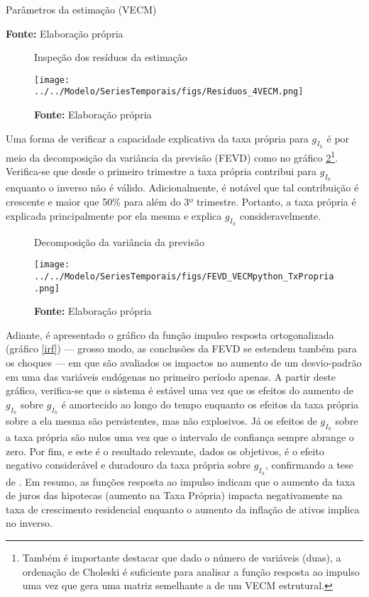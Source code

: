 \begin{table}[H]
	\centering
	\caption{Parâmetros da estimação (VECM)}
	
	\caption*{\textbf{Fonte:} Elaboração própria}
\end{table}

\begin{figure}[H]
	\centering
	\caption{Inspeção dos resíduos da estimação}
	\label{residuos}
	\texttt{[image: ../../Modelo/SeriesTemporais/figs/Residuos\_4VECM.png]}
	\caption*{\textbf{Fonte:} Elaboração própria}
\end{figure}




Uma forma de verificar a capacidade explicativa da taxa própria para $g_{I_h}$ é por meio da decomposição da variância da previsão (FEVD) como no gráfico \ref{fevd}\footnote{Também é importante destacar que dado o número de variáveis (duas), a ordenação de Choleski é suficiente para analisar a função resposta ao impulso uma vez que gera uma matriz semelhante a de um VECM estrutural. 
}. Verifica-se que desde o primeiro trimestre a taxa própria contribui para $g_{I_h}$ enquanto o inverso não é válido. Adicionalmente, é notável que tal contribuição é crescente e maior que 50\% para além do 3º trimestre. Portanto, a taxa própria é explicada principalmente por ela mesma e explica $g_{I_h}$ consideravelmente.

\begin{figure}[htb]
	\centering
	\caption{Decomposição da variância da previsão}
	\label{fevd}
	\texttt{[image: ../../Modelo/SeriesTemporais/figs/FEVD\_VECMpython\_TxPropria.png]}
	\caption*{\textbf{Fonte:} Elaboração própria}
\end{figure}


Adiante, é apresentado o gráfico da função impulso resposta ortogonalizada (gráfico \ref{irf}) --- grosso modo, as conclusões da FEVD se estendem também para os choques --- em que são avaliados os impactos no aumento de um desvio-padrão em uma das variáveis endógenas no primeiro período apenas.
A partir deste gráfico, verifica-se que o sistema é estável uma vez que os efeitos do aumento de $g_{I_h}$ sobre $g_{I_h}$ é amortecido ao longo do tempo enquanto os efeitos da taxa própria sobre a ela mesma são persistentes, mas não explosivos.
Já os efeitos de $g_{I_h}$ sobre a taxa própria são nulos uma vez que o intervalo de confiança sempre abrange o zero. Por fim, e este é o resultado relevante, dados os objetivos, é o efeito negativo considerável e duradouro da taxa própria sobre $g_{I_h}$, confirmando a tese de \textcite{teixeira_crescimento_2015}.
Em resumo, as funções resposta ao impulso indicam que o aumento da taxa de juros das hipotecas (aumento na Taxa Própria) impacta negativamente na taxa de crescimento residencial enquanto o aumento da inflação de ativos implica no inverso. 


